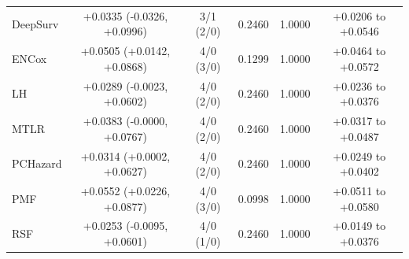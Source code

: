 \begin{table}[t]
\begin{tabular}{lccccc}
DeepSurv & +0.0335 (-0.0326, +0.0996) & 3/1 (2/0) & 0.2460 & 1.0000 & +0.0206 to +0.0546 \\
ENCox & +0.0505 (+0.0142, +0.0868) & 4/0 (3/0) & 0.1299 & 1.0000 & +0.0464 to +0.0572 \\
LH & +0.0289 (-0.0023, +0.0602) & 4/0 (2/0) & 0.2460 & 1.0000 & +0.0236 to +0.0376 \\
MTLR & +0.0383 (-0.0000, +0.0767) & 4/0 (2/0) & 0.2460 & 1.0000 & +0.0317 to +0.0487 \\
PCHazard & +0.0314 (+0.0002, +0.0627) & 4/0 (2/0) & 0.2460 & 1.0000 & +0.0249 to +0.0402 \\
PMF & +0.0552 (+0.0226, +0.0877) & 4/0 (3/0) & 0.0998 & 1.0000 & +0.0511 to +0.0580 \\
RSF & +0.0253 (-0.0095, +0.0601) & 4/0 (1/0) & 0.2460 & 1.0000 & +0.0149 to +0.0376 \\
\bottomrule
\end{tabular}
\end{table}
